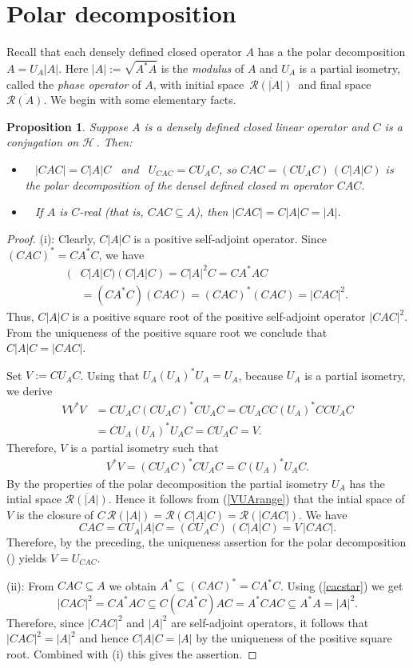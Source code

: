 \documentclass[12pt]{amsart}
\newcommand{\cR}{\mathcal{R}}
\newtheorem{prop}[thm]{Proposition}
\theoremstyle{definition}
\newcommand{\cH}{\mathcal{H}\,}
\newcommand{\ov}{\overline}
\begin{document}
\section{Polar decomposition}\label{polardecomposition}
Recall that each densely defined closed operator $A$ has a the polar decomposition $A=U_A|A|$. Here $|A|:=\sqrt{A^*A}$ is the \emph{modulus} of $A$ and $U_A$ is a partial isometry, called the \emph{phase operator} of $A$, with initial space\, $\ov{\cR(|A|) }$\, and final space\, $\ov{\cR(A) }$. We begin with some elementary facts.

\begin{prop}\label{polar1}
Suppose  $A$ is a densely defined closed linear operator and $C$ is a conjugation on $\cH$.  Then:
\begin{itemize}
\item[\em (i)]~ $|CAC|=C|A|C$~ and~  $U_{CAC}=CU_A C$, so $CAC=(CU_AC)\, (C|A|C)$ is the polar decomposition of the densel defined closed m operator $CAC$.
\item[\em(ii)] ~
If $A$ is $C$-real (that is, $CAC\subseteq A$), then $|CAC|=C|A|C=|A|.$
\end{itemize}
\end{prop}
\begin{proof}
(i): Clearly, $C|A|C$ is a positive self-adjoint operator. Since $(CAC)^*=CA^*C$, we have
\begin{align}\label{cacstar} (&C|A|C)(C|A|C)=C|A|^2C=CA^*AC\nonumber\\ &=(CA^*C)(CAC)=(CAC)^*(CAC)=|CAC|^2.
\end{align}
Thus, $C|A|C$ is a positive square root of the positive self-adjoint operator $|CAC|^2$. From the uniqueness of the positive square root we conclude that $C|A|C=|CAC|.$\smallskip


Set $V:=CU_AC$. Using that $U_A(U_A)^*U_A=U_A$, because $U_A$ is a partial isometry, we derive
 \begin{align*}
VV^*V&=CU_AC(CU_AC)^*CU_AC=CU_ACC(U_A)^*CCU_AC\\ &=CU_A(U_A)^*U_AC=CU_AC=V.
\end{align*}
Therefore, $V$ is a partial isometry such that
\begin{align}\label{VUArange}
 V^*V=(CU_AC)^*CU_AC=C(U_A)^*U_AC.
\end{align}
By the properties of the polar decomposition the partial isometry $U_A$ has the intial space $\ov{\cR(|A|) }$. Hence  it follows from (\ref{VUArange}) that the intial space of $V$ is the closure of
$C\, \cR(|A|)= \cR(C|A|C) =\cR(|CAC|).$ We have $$CAC= CU_A|A|C=(CU_AC)\, (C|A|C)= V\, |CAC|. $$
Therefore, by the preceding, the uniqueness assertion for the polar decomposition (\cite[Theorem 7.2]{sch12}) yields $V=U_{CAC}$. \smallskip

(ii): From $CAC\subseteq A$ we obtain  $A^*\subseteq (CAC)^*=CA^*C$. Using (\ref{cacstar}) we get $$
|CAC|^2=CA^*AC\subseteq C(CA^*C)AC=A^*CAC\subseteq A^*A=|A|^2.$$
Therefore, since $|CAC|^2$ and $|A|^2$ are self-adjoint operators, it follows that $|CAC|^2=|A|^2$ and hence $ C|A|C= |A|$ by the uniqueness of the positive square root. Combined with (i) this gives the assertion.
\end{proof}
\end{document}
